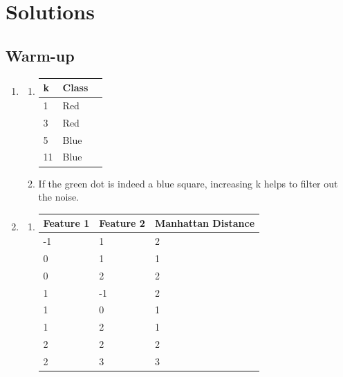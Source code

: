 \documentclass{report}
\begin{document}
\chapter*{Solutions}

\section*{Warm-up}

\begin{enumerate}
  \item   
  	
  	\begin{enumerate}
  	  \item
  	    \begin{center}
          \begin{tabular}{| l | l | l |}
            \hline
            k & Class \\ \hline
            1 & Red\\
            3 & Red\\
            5 & Blue\\
			11 & Blue\\            
            \hline
          \end{tabular}
        \end{center} 
        
        \item If the green dot is indeed a blue square, increasing k helps to filter out the noise.
  	  \end{enumerate} 
  
  \item 
  	\begin{enumerate}
  	  \item
        \begin{center}
          \begin{tabular}{| l | l | l |}
            \hline
            Feature 1 & Feature 2 & Manhattan Distance \\ \hline
            -1 & 1 & 2 \\
            0 & 1 & 1 \\
            0 & 2 & 2 \\
            1 & -1 & 2 \\
            1 & 0 & 1 \\
            1 & 2 & 1 \\
            2 & 2 & 2 \\
            2 & 3 & 3 \\
            \hline
        \end{tabular}
      \end{center}
    

\end{enumerate}
\end{enumerate}
\end{document}
